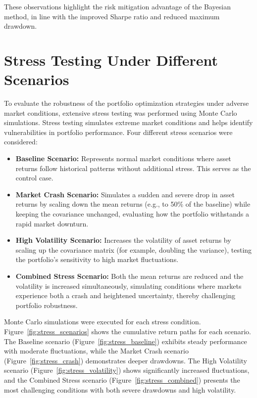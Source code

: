 \documentclass[a4paper,12pt]{article}
\begin{document}
These observations highlight the risk mitigation advantage of the Bayesian method, in line with the improved Sharpe ratio and reduced maximum drawdown.

\section{Stress Testing Under Different Scenarios}
To evaluate the robustness of the portfolio optimization strategies under adverse market conditions, extensive stress testing was performed using Monte Carlo simulations. Stress testing simulates extreme market conditions and helps identify vulnerabilities in portfolio performance. Four different stress scenarios were considered:
\begin{itemize}[noitemsep]
    \item \textbf{Baseline Scenario:} Represents normal market conditions where asset returns follow historical patterns without additional stress. This serves as the control case.
    \item \textbf{Market Crash Scenario:} Simulates a sudden and severe drop in asset returns by scaling down the mean returns (e.g., to 50\% of the baseline) while keeping the covariance unchanged, evaluating how the portfolio withstands a rapid market downturn.
    \item \textbf{High Volatility Scenario:} Increases the volatility of asset returns by scaling up the covariance matrix (for example, doubling the variance), testing the portfolio’s sensitivity to high market fluctuations.
    \item \textbf{Combined Stress Scenario:} Both the mean returns are reduced and the volatility is increased simultaneously, simulating conditions where markets experience both a crash and heightened uncertainty, thereby challenging portfolio robustness.
\end{itemize}

Monte Carlo simulations were executed for each stress condition. Figure~\ref{fig:stress_scenarios} shows the cumulative return paths for each scenario. The Baseline scenario (Figure~\ref{fig:stress_baseline}) exhibits steady performance with moderate fluctuations, while the Market Crash scenario (Figure~\ref{fig:stress_crash}) demonstrates deeper drawdowns. The High Volatility scenario (Figure~\ref{fig:stress_volatility}) shows significantly increased fluctuations, and the Combined Stress scenario (Figure~\ref{fig:stress_combined}) presents the most challenging conditions with both severe drawdowns and high volatility.
\end{document}
